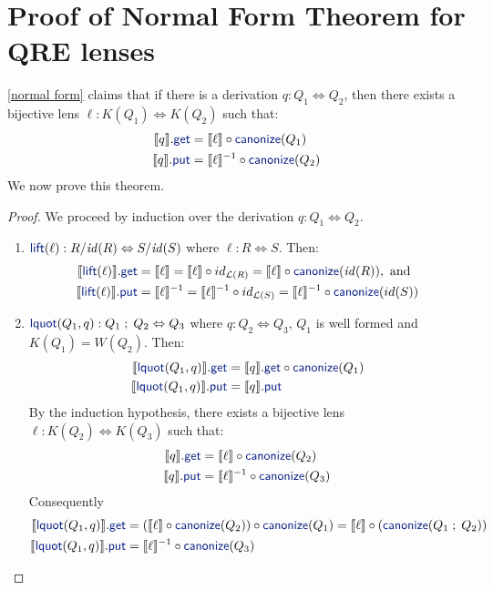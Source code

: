 \documentclass[acmsmall,review,anonymous]{acmart}
\newcommand{\kw}[1]{\textcolor{dkblue}{\ensuremath{\mathsf{#1}}}}
\newcommand{\canonize}{\ensuremath{\kw{canonize}}}
\newcommand{\get}{\ensuremath{\kw{get}}}
\newcommand{\lput}{\ensuremath{\kw{put}}}
\newcommand{\lquot}{\ensuremath{\kw{lquot}}}
\begin{document}
\section{Proof of Normal Form Theorem for QRE lenses}
\cref{normal form} claims that if there is a derivation $q : Q_1
\Leftrightarrow Q_2$, then there exists a bijective lens $\ell : K(Q_1)
\Leftrightarrow K(Q_2)$ such that:
\begin{align*}
\llbracket q \rrbracket.\get &= \llbracket \ell \rrbracket\circ
\canonize(Q_1)\\
\llbracket q \rrbracket.\lput &= \llbracket \ell \rrbracket^{-1} \circ
\canonize(Q_2)
\end{align*}
We now prove this theorem.
\begin{proof}
We proceed by induction over the derivation $q : Q_1 \Leftrightarrow Q_2$.
\begin{enumerate}
  \item
  $\kw{lift}(\ell): R/\mathit{id}(R) \Leftrightarrow S/\mathit{id}(S)$ where
  $\ell : R \Leftrightarrow S$. Then:
  \begin{align*}
\llbracket \kw{lift}(\ell) \rrbracket.\get &=  \llbracket \ell \rrbracket
= \llbracket \ell \rrbracket \circ id_{\mathcal{L}(R)} =
\llbracket \ell \rrbracket \circ \canonize(\mathit{id}(R)), \text{ and }\\
\llbracket \kw{lift}(\ell) \rrbracket.\lput &= \llbracket \ell
\rrbracket^{-1} = \llbracket \ell \rrbracket^{-1} \circ id_{\mathcal{L}(S)} =
\llbracket \ell \rrbracket^{-1} \circ \canonize(id(S))
\end{align*}
\item
$\lquot(Q_1, q): Q_1 \; ; \; Q_2 \Leftrightarrow Q_3$ where $q : Q_2
\Leftrightarrow Q_3$, $Q_1$ is well formed and $K(Q_1) = W(Q_2)$. Then:
\begin{align*}
\llbracket \lquot(Q_1, q) \rrbracket.\get  &= \llbracket q
\rrbracket.\get \circ \canonize(Q_1)\\
\llbracket \lquot(Q_1, q) \rrbracket.\lput &= \llbracket q \rrbracket.\lput
\end{align*}
By the induction hypothesis, there exists a bijective lens $\ell :
K(Q_2) \Leftrightarrow K(Q_3)$ such that:
\begin{align*}
\llbracket q \rrbracket.\get &= \llbracket \ell \rrbracket \circ
\canonize(Q_2)\\
\llbracket q \rrbracket.\lput &= \llbracket \ell \rrbracket^{-1} \circ
\canonize(Q_3)
\end{align*}
Consequently
\begin{align*}
\llbracket \lquot(Q_1, q)\rrbracket.\get  &= (\llbracket \ell \rrbracket \circ
\canonize(Q_2)) \circ \canonize(Q_1) = \llbracket \ell \rrbracket \circ
(\canonize(Q_1 \; ; \; Q_2))\\
\llbracket \lquot(Q_1, q) \rrbracket.\lput &= \llbracket \ell \rrbracket^{-1}
\circ \canonize(Q_3)
\end{align*}


\end{enumerate}
\end{proof}
\end{document}
